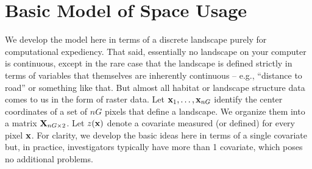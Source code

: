 \section{Basic Model of Space Usage}
\label{rsf.sec.rsfmodel}

We develop the model here in terms of a discrete landscape purely for
computational expediency. That said, essentially no landscape on your
computer is continuous, except in the rare case that the landscape is
defined strictly in terms of variables that themselves are inherently
continuous -- e.g., ``distance to road'' or something like that.  But
almost all habitat or landscape structure data comes to us in the form
of raster data.  Let ${\bf x}_{1},\ldots,{\bf x}_{nG}$ identify the
center coordinates of a set of $nG$ pixels that define a landscape.
We organize them into a matrix ${\bf X}_{nG \times 2}$.  Let $z({\bf
  x})$ denote a covariate measured (or defined) for every pixel ${\bf
  x}$. For clarity, we develop the basic ideas here in terms of a
single covariate but, in practice, investigators typically have more
than 1 covariate, which poses no additional problems.

